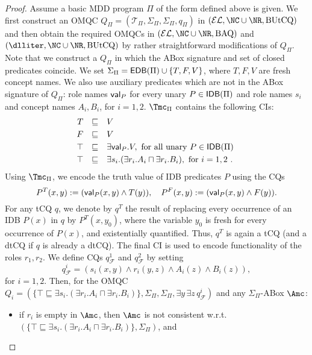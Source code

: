 \documentclass{lmcs}
\theoremstyle{definition}
\begin{document}
\begin{proof}
  Assume a basic MDD program $\Pi$ of the form defined above is given. We first construct an OMQC $Q_{\Pi}=(\mathcal{T}_{\Pi},\Sigma_{\Pi},\Sigma_{\Pi},q_{\Pi})$ in
  $(\mathcal{EL},\NC\cup\NR,\text{BUtCQ})$ and then obtain the
  required OMQCs in $(\mathcal{EL},\NC\cup\NR,\text{BAQ})$ and $(\dlliter,\NC\cup\NR,\text{BUtCQ})$ by rather straightforward
  modifications of $Q_{\Pi}$. Note that we construct a $Q_{\Pi}$ in which the ABox signature and set of closed predicates coincide.
  We set $\Sigma_{\Pi} = {\sf EDB}(\Pi)\cup \{T,F,V\}$, where $T,F,V$ are fresh concept names. We also use auxiliary predicates which are
  not in the ABox signature of $Q_{\Pi}$: role names ${\sf val}_{P}$ for every unary $P\in {\sf IDB}(\Pi)$ and role names $s_{i}$
  and concept names $A_{i},B_{i}$, for $i=1,2$. $\Tmc_{\Pi}$ contains the following CIs:
%
$$
\begin{array}{rcl}
  T &\sqsubseteq& V \\[1mm]
  F &\sqsubseteq& V  \\[1mm]
  \top &\sqsubseteq& \exists {\sf val}_{P}.V, \text{ for all unary $P\in {\sf IDB}(\Pi)$ } \\[1mm]
  \top &\sqsubseteq& \exists s_{i}.(\exists r_{i}.A_{i} \sqcap \exists r_{i}.B_{i}), \text{ for $i=1,2$ }.
\end{array}
$$
%
Using $\Tmc_{\Pi}$, we encode the truth value of IDB predicates $P$ using the CQs 
%
$$
P^{T}(x,y):= ({\sf val}_{P}(x,y)\wedge T(y)), \quad P^{F}(x,y):= ({\sf val}_{P}(x,y)\wedge F(y)).
$$
For any tCQ $q$, we denote by $q^{T}$ the result of replacing every occurrence of an 
IDB $P(x)$ in $q$ by $P^{T}(x,y_{0})$, where the variable $y_{0}$ is fresh for every 
occurrence of $P(x)$, and existentially quantified.
Thus, $q^{T}$ is again a tCQ (and a dtCQ if $q$ is already a dtCQ).
The final CI is used to encode functionality of the roles $r_{1},r_{2}$. We define
CQs $q_{\mathcal{F}}^{1}$ and $q_{\mathcal{F}}^{2}$ by setting
$$
q_{\mathcal{F}}^{i}= (s_{i}(x,y)\wedge r_{i}(y,z)\wedge A_{i}(z) \wedge B_{i}(z)),
$$
for $i=1,2$. Then, for 
the OMQC $Q_{i}=(\{\top \sqsubseteq \exists s_{i}.(\exists r_{i}.A_{i} \sqcap \exists r_{i}.B_{i})\},\Sigma_{\Pi},\Sigma_{\Pi},
\exists y\,\exists z\,q_{\mathcal{F}}^{i})$
and any $\Sigma_{\Pi}$-ABox $\Amc$:
\begin{itemize}
\item if $r_{i}$ is empty in $\Amc$, then $\Amc$ is not consistent w.r.t.~$(\{\top \sqsubseteq \exists s_{i}.(\exists r_{i}.A_{i} \sqcap \exists r_{i}.B_{i})\},\Sigma_{\Pi})$, and 

\end{itemize}
\end{proof}
\end{document}
